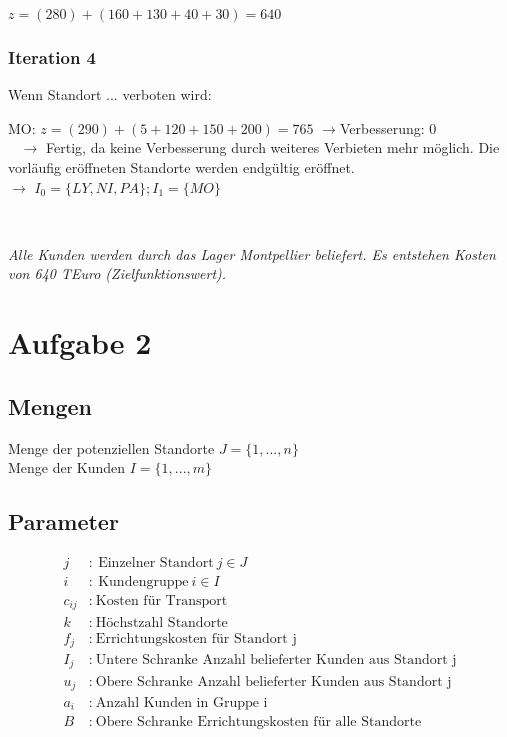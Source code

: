 \documentclass[a4paper,11pt]{article}
\begin{document}
$z = (280) + (160 + 130 + 40 + 30) = 640$ \\

\subsubsection*{Iteration 4}
Wenn Standort ... verboten wird: \newline

MO: $z = (290) + (5 + 120 + 150 + 200) = 765$ $\to$Verbesserung: 0 \\
~\newline
$\longrightarrow$ Fertig, da keine Verbesserung durch weiteres Verbieten mehr möglich. Die vorläufig eröffneten Standorte werden endgültig eröffnet. \\
$\longrightarrow$ $I_0 = \{LY, NI, PA\}; I_1 = \{MO\}$

~\newline

\textit{Alle Kunden werden durch das Lager Montpellier beliefert. Es entstehen Kosten von 640 TEuro (Zielfunktionswert).} \\

\section*{Aufgabe 2}
\subsection*{Mengen}
Menge der potenziellen Standorte $J=\{1,...,n\}$ \\
Menge der Kunden $I=\{1,...,m\}$ \\

\subsection*{Parameter}
\begin{align*}
    j &: ~\text{Einzelner Standort} ~ j \in J \\
    i &: ~\text{Kundengruppe} ~ i \in I \\
    c_{ij} &: ~\text{Kosten für Transport} \\
    k &: ~\text{Höchstzahl Standorte} \\
    f_j &: ~\text{Errichtungskosten für Standort j} \\
    I_j &: ~\text{Untere Schranke Anzahl belieferter Kunden aus Standort j} \\
    u_j &: ~\text{Obere Schranke Anzahl belieferter Kunden aus Standort j} \\
    a_i &: ~\text{Anzahl Kunden in Gruppe i} \\
    B &: ~\text{Obere Schranke Errichtungskosten für alle Standorte} \\
\end{align*}
\end{document}
